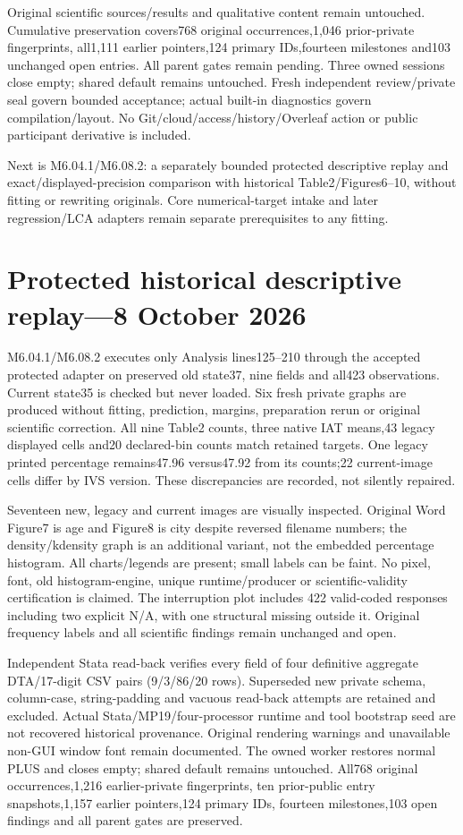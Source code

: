 \documentclass[11pt,a4paper]{article}
\begin{document}
Original scientific sources/results and qualitative content remain untouched.
Cumulative preservation covers768 original occurrences,1,046 prior-private
fingerprints, all1,111 earlier pointers,124 primary IDs,fourteen milestones
and103 unchanged open entries. All parent gates remain pending. Three owned
sessions close empty; shared default remains untouched. Fresh independent
review/private seal govern bounded acceptance; actual built-in diagnostics
govern compilation/layout. No Git/cloud/access/history/Overleaf action or
public participant derivative is included.

Next is M6.04.1/M6.08.2: a separately bounded protected descriptive replay
and exact/displayed-precision comparison with historical Table2/Figures6--10,
without fitting or rewriting originals. Core numerical-target intake and
later regression/LCA adapters remain separate prerequisites to any fitting.

\section{Protected historical descriptive replay---8 October 2026}
M6.04.1/M6.08.2 executes only Analysis lines125--210 through the accepted
protected adapter on preserved old state37, nine fields and all423
observations. Current state35 is checked but never loaded. Six fresh private
graphs are produced without fitting, prediction, margins, preparation rerun
or original scientific correction. All nine Table2 counts, three native IAT
means,43 legacy displayed cells and20 declared-bin counts match retained
targets. One legacy printed percentage remains47.96 versus47.92 from its
counts;22 current-image cells differ by IVS version. These discrepancies
are recorded, not silently repaired.

Seventeen new, legacy and current images are visually inspected. Original
Word Figure7 is age and Figure8 is city despite reversed filename numbers;
the density/kdensity graph is an additional variant, not the embedded
percentage histogram. All charts/legends are present; small labels can be
faint. No pixel, font, old histogram-engine, unique runtime/producer or
scientific-validity certification is claimed. The interruption plot includes
422 valid-coded responses including two explicit N/A, with one structural
missing outside it. Original frequency labels and all scientific findings
remain unchanged and open.

Independent Stata read-back verifies every field of four definitive
aggregate DTA/17-digit CSV pairs (9/3/86/20 rows). Superseded new private
schema, column-case, string-padding and vacuous read-back attempts are
retained and excluded. Actual Stata/MP19/four-processor runtime and tool
bootstrap seed are not recovered historical provenance. Original rendering
warnings and unavailable non-GUI window font remain documented. The owned
worker restores normal PLUS and closes empty; shared default remains
untouched. All768 original occurrences,1,216 earlier-private fingerprints,
ten prior-public entry snapshots,1,157 earlier pointers,124 primary IDs,
fourteen milestones,103 open findings and all parent gates are preserved.
\end{document}
